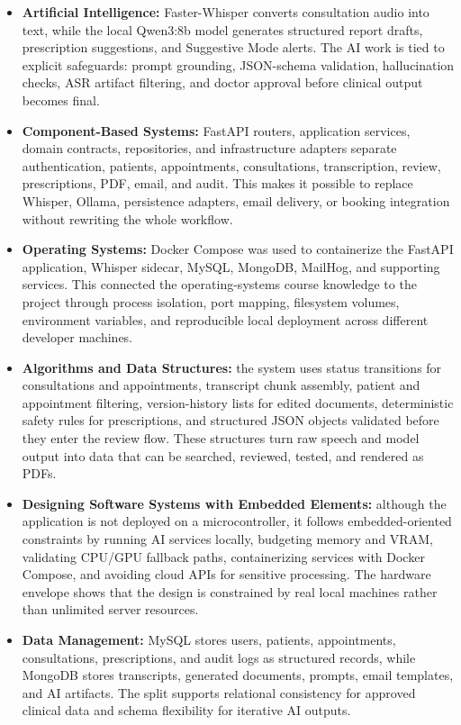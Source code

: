 \begin{itemize}
	\item \textbf{Artificial Intelligence:} Faster-Whisper converts consultation audio into text, while the local Qwen3:8b model generates structured report drafts, prescription suggestions, and Suggestive Mode alerts. The AI work is tied to explicit safeguards: prompt grounding, JSON-schema validation, hallucination checks, ASR artifact filtering, and doctor approval before clinical output becomes final.
	\item \textbf{Component-Based Systems:} FastAPI routers, application services, domain contracts, repositories, and infrastructure adapters separate authentication, patients, appointments, consultations, transcription, review, prescriptions, PDF, email, and audit. This makes it possible to replace Whisper, Ollama, persistence adapters, email delivery, or booking integration without rewriting the whole workflow.
	\item \textbf{Operating Systems:} Docker Compose was used to containerize the FastAPI application, Whisper sidecar, MySQL, MongoDB, MailHog, and supporting services. This connected the operating-systems course knowledge to the project through process isolation, port mapping, filesystem volumes, environment variables, and reproducible local deployment across different developer machines.
	\item \textbf{Algorithms and Data Structures:} the system uses status transitions for consultations and appointments, transcript chunk assembly, patient and appointment filtering, version-history lists for edited documents, deterministic safety rules for prescriptions, and structured JSON objects validated before they enter the review flow. These structures turn raw speech and model output into data that can be searched, reviewed, tested, and rendered as PDFs.
	\item \textbf{Designing Software Systems with Embedded Elements:} although the application is not deployed on a microcontroller, it follows embedded-oriented constraints by running AI services locally, budgeting memory and VRAM, validating CPU/GPU fallback paths, containerizing services with Docker Compose, and avoiding cloud APIs for sensitive processing. The hardware envelope shows that the design is constrained by real local machines rather than unlimited server resources.
	\item \textbf{Data Management:} MySQL stores users, patients, appointments, consultations, prescriptions, and audit logs as structured records, while MongoDB stores transcripts, generated documents, prompts, email templates, and AI artifacts. The split supports relational consistency for approved clinical data and schema flexibility for iterative AI outputs.
\end{itemize}